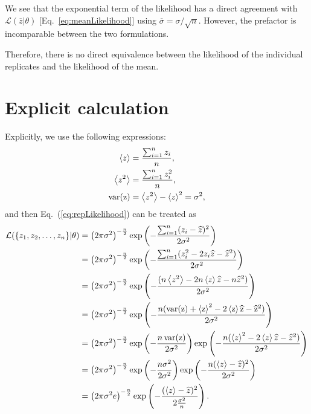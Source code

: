 \documentclass[a4paper,11pt]{article}
\newcommand{\avg}[1]{\left\langle #1 \right\rangle}
\begin{document}
We see that the exponential term of the likelihood has a direct agreement with $\mathcal{L}(\overline{z} | \theta)$ [Eq.~\eqref{eq:meanLikelihood}] using $\overline{\sigma} = \sigma / \sqrt{n}$.
However, the prefactor is incomparable between the two formulations.

Therefore, there is no direct equivalence between the likelihood of the individual replicates and the likelihood of the mean.

\section*{Explicit calculation}
Explicitly, we use the following expressions:
\begin{align*}
\avg{z} &= \frac{\sum_{i=1}^n z_i}{n}, \\
\avg{z^2} &= \frac{\sum_{i=1}^n z_i^2}{n}, \\
\rm{var}(z) &= \avg{z^2} - \avg{z}^2 = \sigma^2,
\end{align*}
and then Eq.~(\ref{eq:repLikelihood}) can be treated as
\begin{align*}
\mathcal{L}(\{z_1,z_2,\dots,z_n\} | \theta)
&= \left(2\pi\sigma^2\right)^{-\frac{n}{2}}\exp\left(-\dfrac{\sum_{i=1}^n (z_i - \widehat{z})^2}{2\sigma^2}\right) \\
&= \left(2\pi\sigma^2\right)^{-\frac{n}{2}}\exp\left(-\dfrac{\sum_{i=1}^n (z_i^2 - 2 z_i \widehat{z} - \widehat{z}^2)}{2\sigma^2}\right) \\
&= \left(2\pi\sigma^2\right)^{-\frac{n}{2}}\exp\left(-\dfrac{(n\avg{z^2} - 2n \avg{z} \widehat{z} - n\widehat{z}^2)}{2\sigma^2}\right) \\
&= \left(2\pi\sigma^2\right)^{-\frac{n}{2}}\exp\left(-\dfrac{n(\rm{var}(z) + \avg{z}^2 - 2 \avg{z} \widehat{z} - \widehat{z}^2)}{2\sigma^2}\right) \\
&= \left(2\pi\sigma^2\right)^{-\frac{n}{2}}\exp\left(-\dfrac{n \, \rm{var}(z)}{2\sigma^2}\right)\exp\left(-\dfrac{n(\avg{z}^2 - 2 \avg{z} \widehat{z} - \widehat{z}^2)}{2\sigma^2}\right) \\
&= \left(2\pi\sigma^2\right)^{-\frac{n}{2}}\exp\left(-\dfrac{n \sigma^2}{2\sigma^2}\right)\exp\left(-\dfrac{n(\avg{z} - \widehat{z})^2}{2\sigma^2}\right) \\
&= \left(2\pi\sigma^2 e\right)^{-\frac{n}{2}} \exp\left(-\dfrac{(\avg{z} - \widehat{z})^2}{2\frac{\sigma^2}{n}}\right).
\end{align*}
\end{document}
